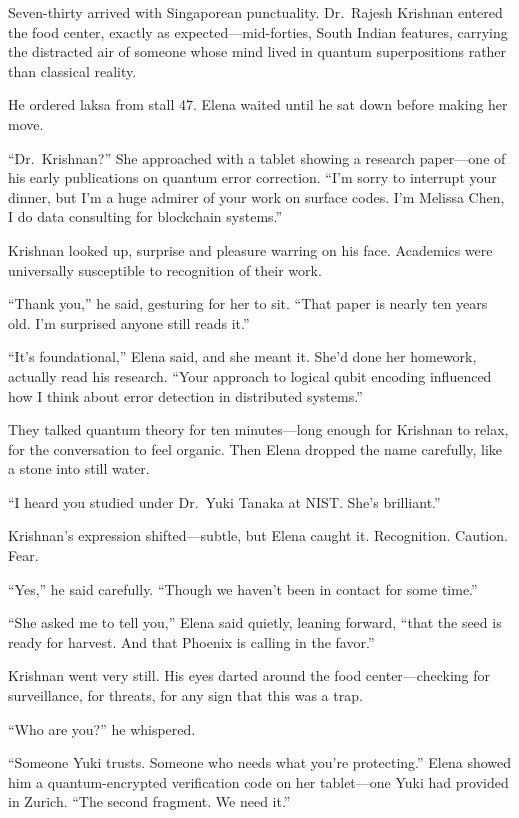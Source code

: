 Seven-thirty arrived with Singaporean punctuality. Dr.~Rajesh Krishnan entered the food center, exactly as expected---mid-forties, South Indian features, carrying the distracted air of someone whose mind lived in quantum superpositions rather than classical reality.

He ordered laksa from stall 47. Elena waited until he sat down before making her move.

``Dr.~Krishnan?'' She approached with a tablet showing a research paper---one of his early publications on quantum error correction. ``I'm sorry to interrupt your dinner, but I'm a huge admirer of your work on surface codes. I'm Melissa Chen, I do data consulting for blockchain systems.''

Krishnan looked up, surprise and pleasure warring on his face. Academics were universally susceptible to recognition of their work.

``Thank you,'' he said, gesturing for her to sit. ``That paper is nearly ten years old. I'm surprised anyone still reads it.''

``It's foundational,'' Elena said, and she meant it. She'd done her homework, actually read his research. ``Your approach to logical qubit encoding influenced how I think about error detection in distributed systems.''

They talked quantum theory for ten minutes---long enough for Krishnan to relax, for the conversation to feel organic. Then Elena dropped the name carefully, like a stone into still water.

``I heard you studied under Dr.~Yuki Tanaka at NIST. She's brilliant.''

Krishnan's expression shifted---subtle, but Elena caught it. Recognition. Caution. Fear.

``Yes,'' he said carefully. ``Though we haven't been in contact for some time.''

``She asked me to tell you,'' Elena said quietly, leaning forward, ``that the seed is ready for harvest. And that Phoenix is calling in the favor.''

Krishnan went very still. His eyes darted around the food center---checking for surveillance, for threats, for any sign that this was a trap.

``Who are you?'' he whispered.

``Someone Yuki trusts. Someone who needs what you're protecting.'' Elena showed him a quantum-encrypted verification code on her tablet---one Yuki had provided in Zurich. ``The second fragment. We need it.''

